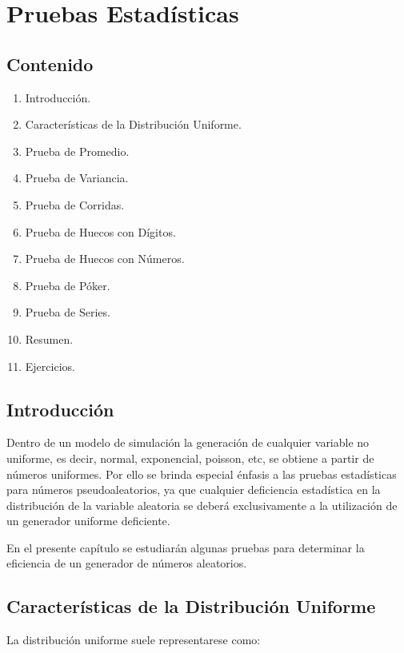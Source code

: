 \chapter{Pruebas Estadísticas}


\section*{Contenido}
\begin{enumerate}
\item Introducción.
\item Características de la Distribución Uniforme.
\item Prueba de Promedio.
\item Prueba de Variancia.
\item Prueba de Corridas.
\item Prueba de Huecos con Dígitos.
\item Prueba de Huecos con Números.
\item Prueba de Póker.
\item Prueba de Series.
\item Resumen.
\item Ejercicios.
\end{enumerate}



\section{Introducción}


Dentro de un modelo de simulación la generación de cualquier variable no uniforme, es decir, normal, exponencial, poisson, etc, se obtiene a partir de números uniformes. Por ello se brinda especial énfasis a las pruebas estadísticas para números pseudoaleatorios, ya que cualquier deficiencia estadística en la distribución de la variable aleatoria se deberá exclusivamente a la utilización de un generador uniforme deficiente. 

En el presente capítulo se estudiarán algunas pruebas para determinar la eficiencia de un generador de números aleatorios.




\section{Características de la Distribución Uniforme}


La distribución uniforme suele representarese como:

